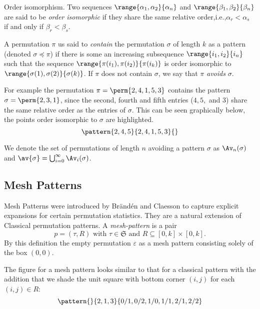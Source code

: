 \begin{definition}{Order isomorphism.}
    Two sequences \(\range{\alpha_1,\alpha_2}{\alpha_n}\) and
    \(\range{\beta_1,\beta_2}{\beta_n}\) are said to be \emph{order isomorphic}
    if they share the same relative order,i.e.,\(\alpha_r<\alpha_s\) if and
    only if \(\beta_r<\beta_s\).
\end{definition}

A permutation \(\pi\) us said to \emph{contain} the permutation \(\sigma\) of
length \(k\) as a pattern (denoted \(\sigma \preceq \pi\)) if there is some
an increasing subsequence \(\range{i_1,i_2}{i_n}\) such that the sequence
\(\range{\pi(i_1),\pi(i_2)}{\pi(i_k)}\) is order isomorphic to
\(\range{\sigma(1),\sigma(2)}{\sigma(k)}\). If \(\pi\) does not contain
\(\sigma\), we say that \(\pi\) \emph{avoids} \(\sigma\).

For example the permutation \(\pi = \perm{2,4,1,5,3}\) contains the pattern
\(\sigma = \perm{2,3,1}\), since the second, fourth and fifth entries
(\(4,5,\) and \(3\)) share the same relative order as the entries of \(\sigma\).
This can be seen graphically below, the points order isomorphic to \(\sigma\)
are highlighted.
\begin{equation*}
    \pattern{2,4,5}{2,4,1,5,3}{}
\end{equation*}

We denote the set of permutations of length \(n\) avoiding a pattern \(\sigma\)
as \(\Av_n(\sigma)\) and \(\av{\sigma} = \bigcup_{i=0}^{\infty}\Av_i(\sigma)\).

\subsection{Mesh Patterns}
Mesh Patterns were introduced by Brändén and Claesson to capture explicit expansions
for certain permutation statistics. They are a natural extension of Classical
permutation patterns. A \emph{mesh-pattern} is a pair
\begin{equation*}
    p = (\tau,R)\text{ with } \tau \in \mathfrak{S} \text{ and } R \subseteq
    [0,k]\times [0,k].
\end{equation*}
By this definition the empty permutation \(\varepsilon\) as a mesh pattern consisting solely of the
box \((0,0)\).

The figure for a mesh pattern looks similar to that for a classical pattern with the
addition that we shade the unit square with bottom corner \((i,j)\) for each \((i,j) \in R\):
\begin{equation*}
    \pattern{}{ 2, 1, 3 }{ 0/1, 0/2, 1/0, 1/1, 2/1, 2/2 }
\end{equation*}

